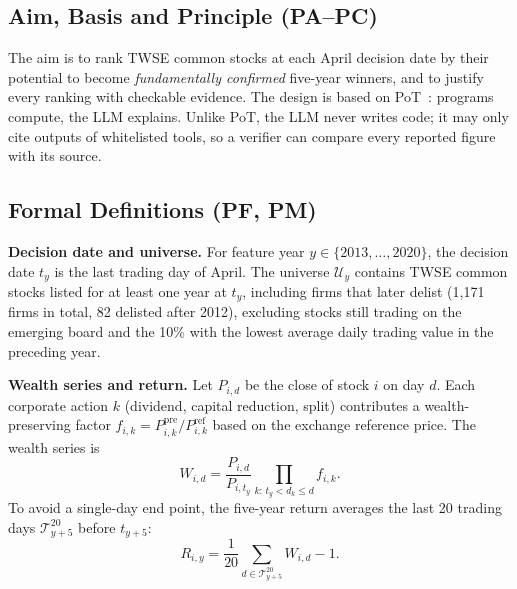 \documentclass[conference]{IEEEtran}
\begin{document}
\subsection{Aim, Basis and Principle (PA--PC)}
The aim is to rank TWSE common stocks at each April decision date by their potential to become \emph{fundamentally confirmed} five-year winners, and to justify every ranking with checkable evidence. The design is based on PoT~\cite{b4}: programs compute, the LLM explains. Unlike PoT, the LLM never writes code; it may only cite outputs of whitelisted tools, so a verifier can compare every reported figure with its source.

\subsection{Formal Definitions (PF, PM)}
\textbf{Decision date and universe.} For feature year $y \in \{2013,\dots,2020\}$, the decision date $t_y$ is the last trading day of April. The universe $\mathcal{U}_y$ contains TWSE common stocks listed for at least one year at $t_y$, including firms that later delist (1,171 firms in total, 82 delisted after 2012), excluding stocks still trading on the emerging board and the 10\% with the lowest average daily trading value in the preceding year.

\textbf{Wealth series and return.} Let $P_{i,d}$ be the close of stock $i$ on day $d$. Each corporate action $k$ (dividend, capital reduction, split) contributes a wealth-preserving factor $f_{i,k} = P^{\text{pre}}_{i,k}/P^{\text{ref}}_{i,k}$ based on the exchange reference price. The wealth series is
\begin{equation}
W_{i,d} = \frac{P_{i,d}}{P_{i,t_y}} \prod_{k:\, t_y < d_k \le d} f_{i,k}.
\end{equation}
To avoid a single-day end point, the five-year return averages the last 20 trading days $\mathcal{T}^{20}_{y+5}$ before $t_{y+5}$:
\begin{equation}
R_{i,y} = \frac{1}{20}\sum_{d \in \mathcal{T}^{20}_{y+5}} W_{i,d} - 1 .
\end{equation}
\end{document}
